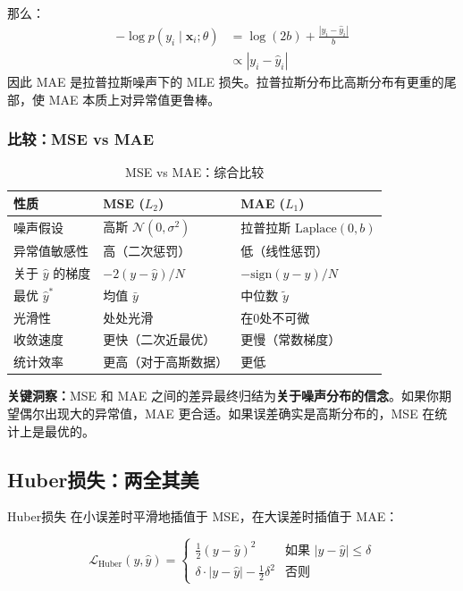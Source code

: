 那么：
\begin{align}
-\log p(y_i \mid \mathbf{x}_i; \theta) &= \log(2b) + \frac{|y_i - \hat{y}_i|}{b} \\
&\propto |y_i - \hat{y}_i|
\end{align}
因此 MAE 是拉普拉斯噪声下的 MLE 损失。拉普拉斯分布比高斯分布有更重的尾部，使 MAE 本质上对异常值更鲁棒。

\subsubsection{比较：MSE vs MAE}

\begin{table}[ht]
    \centering
    \caption{MSE vs MAE：综合比较}
    \begin{tabular}{L{3cm} L{4cm} L{4.5cm}}
        \toprule
        \textbf{性质} & \textbf{MSE ($L_2$)} & \textbf{MAE ($L_1$)} \\
        \midrule
        噪声假设 & 高斯 $\mathcal{N}(0, \sigma^2)$ & 拉普拉斯 $\text{Laplace}(0, b)$ \\
        异常值敏感性 & 高（二次惩罚） & 低（线性惩罚） \\
        关于 $\hat{y}$ 的梯度 & $-2(y - \hat{y})/N$ & $-\text{sign}(y - \hat{y})/N$ \\
        最优 $\hat{y}^*$ & 均值 $\bar{y}$ & 中位数 $\tilde{y}$ \\
        光滑性 & 处处光滑 & 在0处不可微 \\
        收敛速度 & 更快（二次近最优） & 更慢（常数梯度） \\
        统计效率 & 更高（对于高斯数据） & 更低 \\
        \bottomrule
    \end{tabular}
\end{table}

\textbf{关键洞察：}MSE 和 MAE 之间的差异最终归结为\textbf{关于噪声分布的信念}。如果你期望偶尔出现大的异常值，MAE 更合适。如果误差确实是高斯分布的，MSE 在统计上是最优的。

\subsection{Huber损失：两全其美}

Huber损失 \cite{huber1964robust} 在小误差时平滑地插值于 MSE，在大误差时插值于 MAE：

\begin{equation}
\mathcal{L}_{\text{Huber}}(y, \hat{y}) = 
\begin{cases}
\frac{1}{2}(y - \hat{y})^2 & \text{如果 } |y - \hat{y}| \leq \delta \\
\delta \cdot |y - \hat{y}| - \frac{1}{2}\delta^2 & \text{否则}
\end{cases}
\end{equation}

